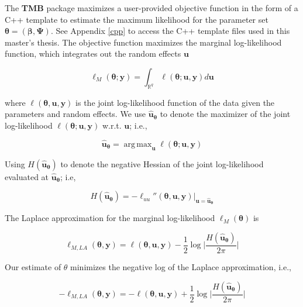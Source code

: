 \documentclass[a4paper,twoside,11pt]{report} %
\DeclareMathOperator*{\argmax}{arg\,max}
\theoremstyle{definition}
\theoremstyle{definition}
\theoremstyle{definition}
\theoremstyle{definition}
\theoremstyle{remark}
\begin{document}
The \textbf{TMB} package maximizes a user-provided objective function in the form of a C++ template to estimate the maximum likelihood for the parameter set \(\boldsymbol \theta = (\boldsymbol{\beta, \Psi})\). See Appendix \ref{cpp} to access the C++ template files used in this master's thesis. The objective function maximizes the marginal log-likelihood function, which integrates out the random effects \(\boldsymbol u\)

\begin{equation}
  \ell_{M}(\boldsymbol{\theta; y})=\int_{\mathbb{R}^{q}} \ell (\boldsymbol{\theta;u,y}) d\boldsymbol{u}
\end{equation}

where \(\ell(\boldsymbol{\theta, u,y})\) is the joint log-likelihood function of the data given the parameters and random effects. We use \(\hat{\boldsymbol u}_{\boldsymbol \theta}\) to denote the maximizer of the joint log-likelihood \(\ell(\boldsymbol{\theta;u,y})\) w.r.t. \(\boldsymbol u\); i.e.,

\begin{equation}
  \hat{\boldsymbol u}_{\boldsymbol \theta}=\argmax_{\boldsymbol u} \ell(\boldsymbol{\theta;u,y})
\end{equation}

Using \(H(\hat{\boldsymbol u}_{\boldsymbol \theta})\) to denote the negative Hessian of the joint log-likelihood evaluated at \(\hat{\boldsymbol u}_{\boldsymbol \theta}\); i.e,

\begin{equation}
  H(\hat{\boldsymbol u}_{\boldsymbol \theta}) =-\ell_{uu}''(\boldsymbol{\theta, u, y})|_{\boldsymbol u=\hat{\boldsymbol u}_{\boldsymbol \theta}}
\end{equation}

The Laplace approximation for the marginal log-likelihood \(\ell_M(\boldsymbol \theta)\) is

\begin{equation}
  \ell_{M,LA}(\boldsymbol{\theta, y})=\ell(\boldsymbol{\theta,u,y})-\frac{1}{2}\log \Big|\frac{H(\hat{\boldsymbol u}_{\boldsymbol \theta})}{2\pi}\Big|
\end{equation}

Our estimate of \(\theta\) minimizes the negative log of the Laplace approximation, i.e.,

\begin{equation}
  -\ell_{M,LA}(\boldsymbol{\theta, y}) = - \ell(\boldsymbol{\theta, u, y}) + \frac{1}{2} \log \Big|\frac{H(\hat{\boldsymbol u}_{\boldsymbol \theta})}{2\pi} \Big|
\end{equation}
\end{document}
